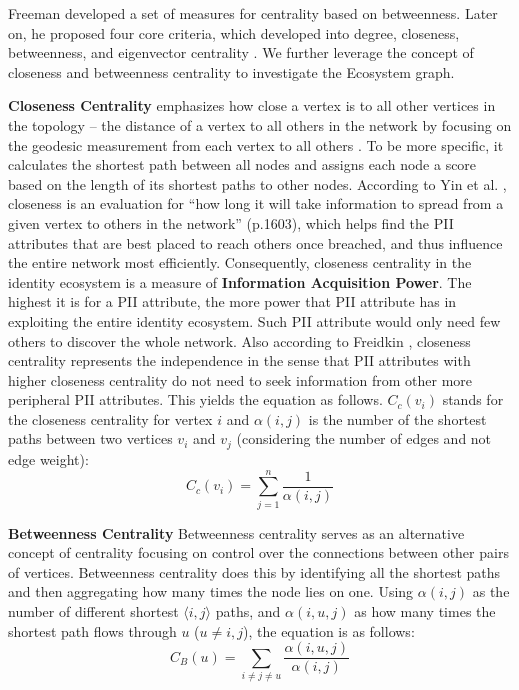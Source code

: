 \documentclass[conference]{IEEEtran}
\begin{document}
Freeman \cite{Freeman78centralityin} developed a set of measures for centrality based on betweenness. Later on, he proposed four core criteria, which developed into degree, closeness, betweenness, and eigenvector centrality  \cite{Freeman79centralityin}. We further leverage the concept of closeness and betweenness centrality to investigate the Ecosystem graph.

\textbf{Closeness Centrality}
  emphasizes how close a vertex is to all other vertices in the topology -- the distance of a vertex to all others in the network by focusing on the geodesic measurement from each vertex to all others  \cite{Freeman79centralityin}. To be more specific, it calculates the shortest path between all nodes and assigns each node a score based on the length of its shortest paths to other nodes. According to Yin et al. \cite{Yin2006}, closeness is an evaluation for ``how long it will take information to spread from a given vertex to others in the network'' (p.1603), which helps find the PII attributes that are best placed to reach others once breached, and thus influence the entire network most efficiently. Consequently, closeness centrality in the identity ecosystem is a measure of {\bf Information Acquisition Power}. The highest it is for a PII attribute, the more power that PII attribute has in exploiting the entire identity ecosystem. Such PII attribute would only need few others to discover the whole network. Also according to Freidkin \cite{Freidkin}, closeness centrality represents the independence in the sense that PII attributes with higher closeness centrality do not need to seek information from other more peripheral PII attributes. 
This yields the equation as follows. $C_{c}(v_{i})$ stands for the closeness centrality for vertex $i$ and $\alpha (i, j)$ is the number of the shortest paths between two vertices $v_i$ and $v_j$ (considering the number of edges and not edge weight):
\begin{equation}
C_{c}(v_{i}) = \sum_{j = 1}^{n} \frac{1}{\alpha (i, j)}
\label{closeness_centrality_equation}
\end{equation}

\textbf{Betweenness Centrality}
Betweenness centrality  \cite{Freeman79centralityin} serves as an alternative concept of centrality focusing on control over the connections between other pairs of vertices. Betweenness centrality does this by identifying all the shortest paths and then aggregating how many times the node lies on one. Using $\alpha (i, j)$ as the number of different shortest $\langle i, j \rangle$ paths, and  $\alpha (i, u, j)$ as how many times the shortest path flows through $u$ ($ u \neq i, j$), the equation is as follows:
\begin{equation}
C_{B}(u) = \sum_{i \neq j \neq u}^{} \frac{\alpha (i, u, j) }{\alpha (i, j)}
\label{betweenness_centrality}
\end{equation}
\end{document}

